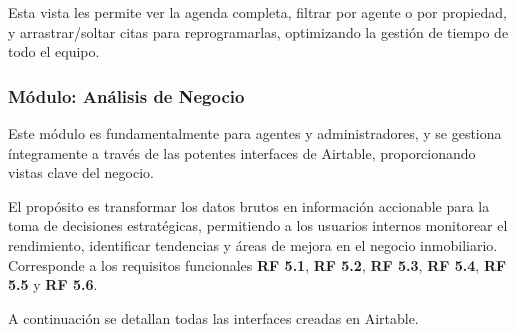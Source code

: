 \begin{enumerate}
\begin{enumerate}
        Esta vista les permite ver la agenda completa, filtrar por agente o por propiedad, y arrastrar/soltar citas para reprogramarlas, optimizando la gestión de tiempo de todo el equipo.

    \end{enumerate}

\end{enumerate}


\subsubsection{Módulo: Análisis de Negocio}


Este módulo es fundamentalmente para agentes y administradores, y se gestiona íntegramente a través de las potentes interfaces de Airtable, proporcionando vistas clave del negocio.

El propósito es transformar los datos brutos en información accionable para la toma de decisiones estratégicas, permitiendo a los usuarios internos monitorear el rendimiento, identificar tendencias y áreas de mejora en el negocio inmobiliario. Corresponde a los requisitos funcionales \textbf{RF 5.1}, \textbf{RF 5.2}, \textbf{RF 5.3}, \textbf{RF 5.4}, \textbf{RF 5.5} y \textbf{RF 5.6}.

A continuación se detallan todas las interfaces creadas en Airtable.

